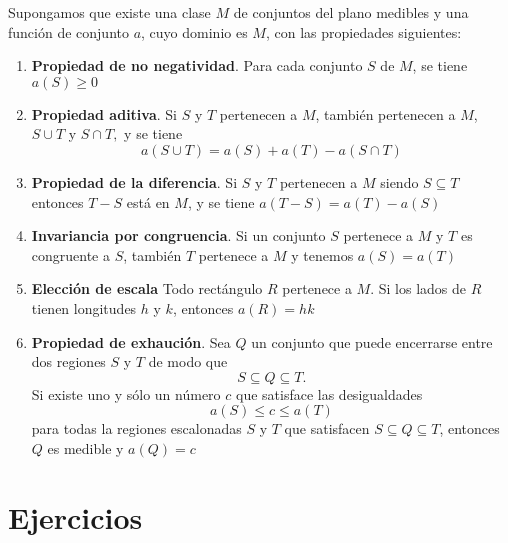    \begin{tcolorbox}
	\begin{axioma}
	    Supongamos que existe una clase $M$ de conjuntos del plano medibles y una función de conjunto $a$, cuyo dominio es $M$, con las propiedades siguientes:
	    \begin{enumerate}[\bfseries 1.]
		\item \textbf{Propiedad de no negatividad}. Para cada conjunto $S$ de $M$, se tiene $a(S)\geq 0$
		\item \textbf{Propiedad aditiva}. Si $S$ y $T$ pertenecen a $M$, también pertenecen a $M$, $S \cup T$ y $S \cap T,$ y se tiene $$a(S \cup T)=a(S)+a(T)-a(S\cap T)$$
		\item \textbf{Propiedad de la diferencia}. Si $S$ y $T$ pertenecen a $M$ siendo $S \subseteq T$ entonces $T - S$ está en $M$, y se tiene $a(T-S)=a(T)-a(S)$ 
		\item \textbf{Invariancia por congruencia}. Si un conjunto $S$ pertenece a $M$ y $T$ es congruente a $S$, también $T$ pertenece a $M$ y tenemos $a(S)=a(T)$
		\item \textbf{Elección de escala} Todo rectángulo $R$ pertenece a $M$. Si los lados de $R$ tienen longitudes $h$ y $k$, entonces $a(R)=hk$
		\item \textbf{Propiedad de exhaución}. Sea $Q$ un conjunto que puede encerrarse entre dos regiones $S$ y $T$ de modo que $$S\subseteq Q \subseteq T.$$ Si existe uno y sólo un número $c$ que satisface las desigualdades $$a(S)\leq c \leq a(T)$$ para todas la regiones escalonadas $S$ y $T$ que satisfacen $S\subseteq Q \subseteq T$, entonces $Q$ es medible y $a(Q)=c$

	    \end{enumerate}

	\end{axioma}
    \end{tcolorbox}
    

\setcounter{section}{6}
\section{Ejercicios}

